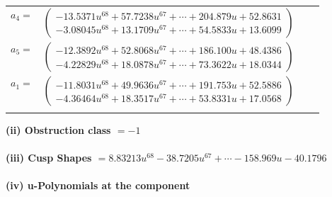 \documentclass[1p]{elsarticle_modified}
\theoremstyle{definition}
\begin{document}
\begin{tabular}{m{7pt} m{180pt} m{7pt} m{180pt} }
\flushright $a_{4}=$&$\begin{pmatrix}-13.5371 u^{68}+57.7238 u^{67}+\cdots+204.879 u+52.8631\\-3.08045 u^{68}+13.1709 u^{67}+\cdots+54.5833 u+13.6099\end{pmatrix}$ \\
\flushright $a_{5}=$&$\begin{pmatrix}-12.3892 u^{68}+52.8068 u^{67}+\cdots+186.100 u+48.4386\\-4.22829 u^{68}+18.0878 u^{67}+\cdots+73.3622 u+18.0344\end{pmatrix}$ \\
\flushright $a_{1}=$&$\begin{pmatrix}-11.8031 u^{68}+49.9636 u^{67}+\cdots+191.753 u+52.5886\\-4.36464 u^{68}+18.3517 u^{67}+\cdots+53.8331 u+17.0568\end{pmatrix}$\\&\end{tabular}
\flushleft \textbf{(ii) Obstruction class $= -1$}\\~\\
\flushleft \textbf{(iii) Cusp Shapes $= 8.83213 u^{68}-38.7205 u^{67}+\cdots-158.969 u-40.1796$}\\~\\
\newpage\renewcommand{\arraystretch}{1}
\flushleft \textbf{(iv) u-Polynomials at the component}\newline \\
\end{document}
